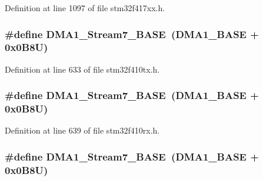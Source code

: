 Definition at line 1097 of file stm32f417xx.\+h.

\subsubsection[{\texorpdfstring{D\+M\+A1\+\_\+\+Stream7\+\_\+\+B\+A\+SE}{DMA1_Stream7_BASE}}]{\setlength{\rightskip}{0pt plus 5cm}\#define D\+M\+A1\+\_\+\+Stream7\+\_\+\+B\+A\+SE~({\bf D\+M\+A1\+\_\+\+B\+A\+SE} + 0x0\+B8\+U)}\hypertarget{group___peripheral__registers__structures_ga82186dd6d3f60995d428b34c041919d7}{}\label{group___peripheral__registers__structures_ga82186dd6d3f60995d428b34c041919d7}


Definition at line 633 of file stm32f410tx.\+h.

\subsubsection[{\texorpdfstring{D\+M\+A1\+\_\+\+Stream7\+\_\+\+B\+A\+SE}{DMA1_Stream7_BASE}}]{\setlength{\rightskip}{0pt plus 5cm}\#define D\+M\+A1\+\_\+\+Stream7\+\_\+\+B\+A\+SE~({\bf D\+M\+A1\+\_\+\+B\+A\+SE} + 0x0\+B8\+U)}\hypertarget{group___peripheral__registers__structures_ga82186dd6d3f60995d428b34c041919d7}{}\label{group___peripheral__registers__structures_ga82186dd6d3f60995d428b34c041919d7}


Definition at line 639 of file stm32f410rx.\+h.

\subsubsection[{\texorpdfstring{D\+M\+A1\+\_\+\+Stream7\+\_\+\+B\+A\+SE}{DMA1_Stream7_BASE}}]{\setlength{\rightskip}{0pt plus 5cm}\#define D\+M\+A1\+\_\+\+Stream7\+\_\+\+B\+A\+SE~({\bf D\+M\+A1\+\_\+\+B\+A\+SE} + 0x0\+B8\+U)}\hypertarget{group___peripheral__registers__structures_ga82186dd6d3f60995d428b34c041919d7}{}\label{group___peripheral__registers__structures_ga82186dd6d3f60995d428b34c041919d7}


